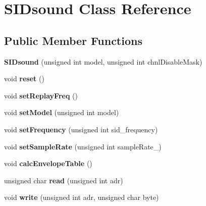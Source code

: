 \hypertarget{class_s_i_dsound}{}\section{S\+I\+Dsound Class Reference}
\label{class_s_i_dsound}
\subsection*{Public Member Functions}
\begin{DoxyCompactItemize}
\item 
\mbox{\label{class_s_i_dsound_af4115d156d31aecdb754464369346827}} 
{\bfseries S\+I\+Dsound} (unsigned int model, unsigned int chnl\+Disable\+Mask)
\item 
\mbox{\label{class_s_i_dsound_a46a43a904b8bf5dad31d6e84336eac9c}} 
void {\bfseries reset} ()
\item 
\mbox{\label{class_s_i_dsound_a6e8f7779d38ec504faa6a56c6bd9e34c}} 
void {\bfseries set\+Replay\+Freq} ()
\item 
\mbox{\label{class_s_i_dsound_a379b984fd04561847c55a689560d4526}} 
void {\bfseries set\+Model} (unsigned int model)
\item 
\mbox{\label{class_s_i_dsound_a920cd2e6ea0d03b6c50830d09f6df5b0}} 
void {\bfseries set\+Frequency} (unsigned int sid\+\_\+frequency)
\item 
\mbox{\label{class_s_i_dsound_a05e4c58e7d217f73b4ef3248f9200632}} 
void {\bfseries set\+Sample\+Rate} (unsigned int sample\+Rate\+\_\+)
\item 
\mbox{\label{class_s_i_dsound_ac0d811046c1e7ca244502320f980a66c}} 
void {\bfseries calc\+Envelope\+Table} ()
\item 
\mbox{\label{class_s_i_dsound_af48fdd685885fdfa5170d9abfe9ed41f}} 
unsigned char {\bfseries read} (unsigned int adr)
\item 
\mbox{\label{class_s_i_dsound_a9fb044dab59b0196f68a987252b71790}} 
void {\bfseries write} (unsigned int adr, unsigned char byte)

\end{DoxyCompactItemize}
